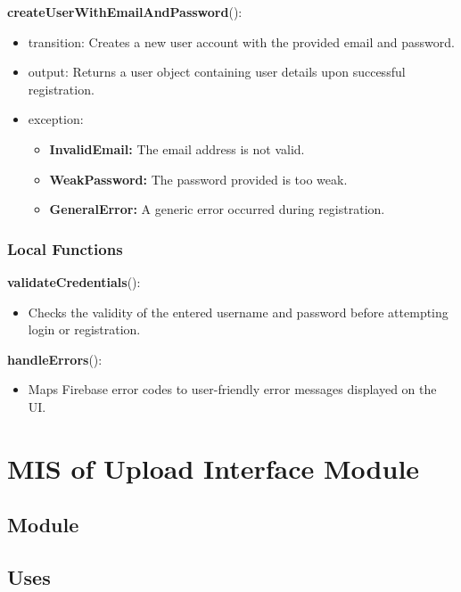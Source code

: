 \documentclass[12pt, titlepage]{article}
\begin{document}
\noindent \textbf{createUserWithEmailAndPassword}():
\begin{itemize}
\item transition: Creates a new user account with the provided email and password.
\item output: Returns a user object containing user details upon successful registration.
\item exception: 
    \begin{itemize}
        \item \textbf{InvalidEmail:} The email address is not valid.
        \item \textbf{WeakPassword:} The password provided is too weak.
        \item \textbf{GeneralError:} A generic error occurred during registration.
    \end{itemize}
\end{itemize}

\subsubsection{Local Functions}

\textbf{validateCredentials}():
\begin{itemize}
\item Checks the validity of the entered username and password before attempting login or registration.
\end{itemize}

\textbf{handleErrors}():
\begin{itemize}
\item Maps Firebase error codes to user-friendly error messages displayed on the UI.
\end{itemize}



\section{MIS of Upload Interface Module}\label{upload_interface_module}

\subsection{Module}


\subsection{Uses}
\end{document}
